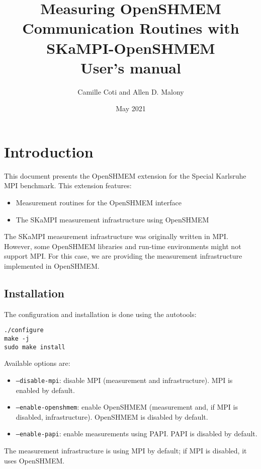 \documentclass[12pt, letterpaper]{article}
\author{Camille Coti and Allen D. Malony}
\title{Measuring OpenSHMEM Communication Routines with SKaMPI-OpenSHMEM\\
User's manual}
\date{May 2021}
\begin{document}
\maketitle
  \tableofcontents

\section{Introduction}

This document presents the OpenSHMEM extension for the Special Karlsruhe MPI benchmark. This extension features:
\begin{itemize}
    \item Measurement routines for the OpenSHMEM interface
    \item The SKaMPI measurement infrastructure using OpenSHMEM
\end{itemize}

The SKaMPI measurement infrastructure was originally written in MPI. However, some OpenSHMEM libraries and run-time environments might not support MPI. For this case, we are providing the measurement infrastructure implemented in OpenSHMEM.

\subsection{Installation}

The configuration and installation is done using the autotools:

\begin{lstlisting}
./configure
make -j
sudo make install
\end{lstlisting}

Available options are:
\begin{itemize}
    \item {\tt --disable-mpi}: disable MPI (measurement and infrastructure). MPI is enabled by default.
    \item {\tt --enable-openshmem}: enable OpenSHMEM (measurement and, if MPI is disabled, infrastructure). OpenSHMEM is disabled by default.
    \item {\tt --enable-papi}: enable measurements using PAPI. PAPI is disabled by default.
\end{itemize}

The measurement infrastructure is using MPI by default; if MPI is disabled, it uses OpenSHMEM.
\end{document}
